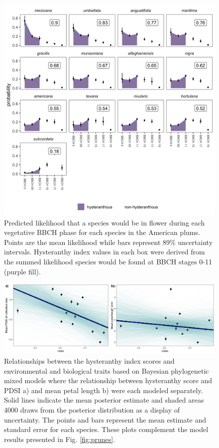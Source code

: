 \documentclass{article}[11pt]
\begin{document}
\begin{figure}[ht]
    \centering
 \includegraphics[width=.7\textwidth]{..//..//Plots/whatReviwerswant/sps_preds_nodoy4supp.jpeg}
    \caption{Predicted likelihood that a species would be in flower during each vegetative BBCH phase for each species in the American plums. Points are the mean likelihood while bars represent 89\% uncertainty intervals. Hysteranthy index values in each box were derived from the summed likelihood species would be found at BBCH stages 0-11 (purple fill).}
    \label{fig:nodoy}
\end{figure}

\begin{figure}[ht]
    \centering
 \includegraphics[width=.7\textwidth]{..//..//Plots/dataplots_SUPP.jpeg}
    \caption{Relationships between the hysteranthy index scores and environmental and biological traits based on Bayesian phylogenetic mixed models where the relationship between hysteranthy score and PDSI a)  and mean petal length b)  were each modeled separately. Solid lines indicate the mean posterior estimate and shaded areas 4000 draws from the posterior distribution as a display of uncertainty. The points and bars represent the mean estimate and standard error for each species. These plots complement the model results presented in Fig. \ref{fig:prunes}.}
    \label{fig:seps}
\end{figure}
\end{document}
